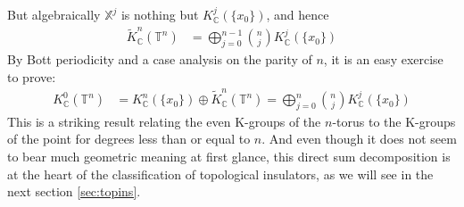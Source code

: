 But algebraically $\mathbb{X}^{j}$ is nothing but $K_{\mathbb{C}}^{j}(\lbrace x_{0} \rbrace)$, and hence
\begin{align*}
  \tilde{K}_{\mathbb{C}}^{n}(\mathbb{T}^{n})
  &=
  \bigoplus_{j=0}^{n-1}
  \binom{n}{j}
  K_{\mathbb{C}}^{j}(\lbrace x_{0} \rbrace)
\end{align*}
By Bott periodicity and a case analysis on the parity of $n$, it is an easy exercise to prove:
\begin{align*}
  K_{\mathbb{C}}^{0}(\mathbb{T}^{n})
  &=
  K_{\mathbb{C}}^{n}(\{ x_{0} \})
  \oplus
  \tilde{K}_{\mathbb{C}}^{n}(\mathbb{T}^{n})
  =
  \bigoplus_{j=0}^{n}
  \binom{n}{j}
  K_{\mathbb{C}}^{j}(\lbrace x_{0} \rbrace)
\end{align*}
This is a striking result relating the even K-groups of the $n$-torus to the K-groups of the point for degrees less than or equal to $n$.
And even though it does not seem to bear much geometric meaning at first glance, this direct sum decomposition is at the heart of the classification of topological insulators, as we will see in the next section \ref{sec:topins}.
